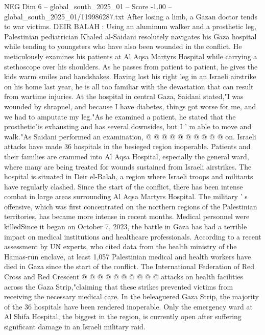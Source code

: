 \begin{textsample}{NEG Dim 6 – global\_south\_2025\_01 – Score -1.00 – global\_south\_2025\_01/119986287.txt}  \label{ex:f6_neg_095}
After losing a limb, a Gazan doctor tends to war victims.
DEIR BALAH : Using an aluminum walker and a prosthetic leg, Palestinian pediatrician Khaled al-Saidani resolutely navigates his Gaza hospital while tending to youngsters who have also been wounded in the conflict.
He meticulously examines his patients at Al Aqsa Martyrs Hospital while carrying a stethoscope over his shoulders.
As he passes from patient to patient, he gives the kids warm smiles and handshakes.
Having lost his right leg in an Israeli airstrike on his home last year, he is all too familiar with the devastation that can result from wartime injuries.
At the hospital in central Gaza, Saidani stated,"I was wounded by shrapnel, and because I have diabetes, things got worse for me, and we had to amputate my leg."As he examined a patient, he stated that the prosthetic"is exhausting and has several downsides, but I ' m able to move and walk."As Saidani performed an examination, @ @ @ @ @ @ @ @ @ @ on.
Israeli attacks have made 36 hospitals in the besieged region inoperable.
Patients and their families are crammed into Al Aqsa Hospital, especially the general ward, where many are being treated for wounds sustained from Israeli airstrikes.
The hospital is situated in Deir el-Balah, a region where Israeli troops and militants have regularly clashed.
Since the start of the conflict, there has been intense combat in large areas surrounding Al Aqsa Martyrs Hospital.
The military ' s offensive, which was first concentrated on the northern regions of the Palestinian territories, has became more intense in recent months.
Medical personnel were killedSince it began on October 7, 2023, the battle in Gaza has had a terrible impact on medical institutions and healthcare professionals.
According to a recent assessment by UN experts, who cited data from the health ministry of the Hamas-run enclave, at least 1,057 Palestinian medical and health workers have died in Gaza since the start of the conflict.
The International Federation of Red Cross and Red Crescent @ @ @ @ @ @ @ @ @ @ attacks on health facilities across the Gaza Strip,"claiming that these strikes prevented victims from receiving the necessary medical care.
In the beleaguered Gaza Strip, the majority of the 36 hospitals have been rendered inoperable.
Only the emergency ward at Al Shifa Hospital, the biggest in the region, is currently open after suffering significant damage in an Israeli military raid.

\end{textsample}
